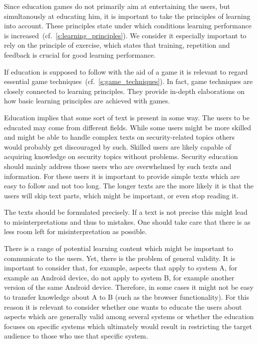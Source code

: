 \begin{description}[leftmargin=0cm]
	\item[Principles of Learning:] Since education games do not primarily aim at entertaining the users, but simultanously at educating him, it is important to take the principles of learning into account.
These principles state under which conditions learning performance is increased~(cf.~\autoref{s:learning_principles}).
We consider it especially important to rely on the principle of exercise, which states that training, repetition and feedback is crucial for good learning performance.
	\item[Game Techniques:]  If education is supposed to follow with the aid of a game it is relevant to regard essential game techniques~(cf.~\autoref{s:game_techniques}).
In fact, game techniques are closely connected to learning principles.
They provide in-depth elaborations on how basic learning principles are achieved with games.
	\item[Simple and Short Text:] Education implies that some sort of text is present in some way.
The users to be educated may come from different fields.
While some users might be more skilled and might be able to handle complex texts on security-related topics others would probably get discouraged by such.
Skilled users are likely capable of acquiring knowledge on security topics without problems.
Security education should mainly address those users who are overwhelmed by such texts and information.
For these users it is important to provide simple texts which are easy to follow and not too long.
The longer texts are the more likely it is that the users will skip text parts, which might be important, or even stop reading it.
\item[Precise Phrasing:] The texts should be formulated precisely. 
If a text is not precise this might lead to misinterpretations and thus to mistakes. 
One should take care that there is as less room left for misinterpretation as possible.
\item[General Validity:] There is a range of potential learning content which might be important to communicate to the users.
Yet, there is the problem of general validity.
It is important to consider that, for example, aspects that apply to system A, for example an Android device, do not apply to system B, for example another version of the same Android device.
Therefore, in some cases it might not be easy to transfer knowledge about A to B (such as the browser functionality).
For this reason it is relevant to consider whether one wants to educate the users about aspects which are generally valid among several systems or whether the education focuses on specific systems which ultimately would result in restricting the target audience to those who use that specific system.
\end{description}


